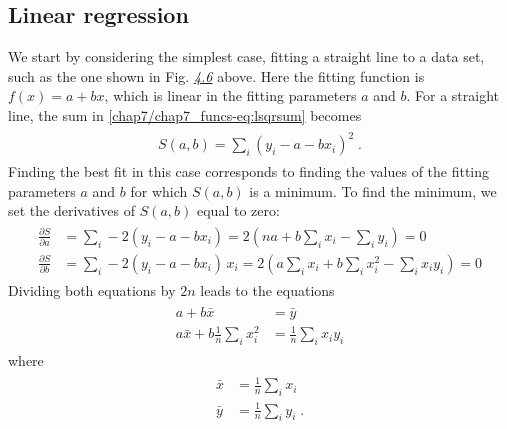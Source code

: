 \documentclass[letterpaper,10pt,english]{sphinxmanual}
\begin{document}
\subsection{Linear regression}
\label{chap7/chap7_funcs:linear-regression}
We start by considering the simplest case, fitting a straight line to a data set, such as the one shown in Fig. {\hyperref[chap7/chap7_funcs:fig-fallingmassdataplot]{\emph{4.6}}} above.  Here the fitting function is $f(x) = a + bx$, which is linear in the fitting parameters $a$ and $b$.  For a straight line, the sum in \eqref{chap7/chap7_funcs-eq:lsqrsum} becomes
\label{chap7/chap7_funcs:equation-eq:linreg1}\begin{gather}
\begin{split}S(a,b) = \sum_{i} (y_{i} - a - bx_{i})^2 \;.\end{split}\label{chap7/chap7_funcs-eq:linreg1}
\end{gather}
Finding the best fit in this case corresponds to finding the values of the fitting parameters $a$ and $b$ for which $S(a,b)$ is a minimum.  To find the minimum, we set the derivatives of $S(a,b)$ equal to zero:
\label{chap7/chap7_funcs:equation-eq:linreg2}\begin{gather}
\begin{split}\frac{\partial S}{\partial a} &= \sum_{i}-2(y_{i}-a-bx_{i}) = 2 \left(na + b\sum_{i}x_{i} - \sum_{i}y_{i} \right) = 0 \\
\frac{\partial S}{\partial b} &= \sum_{i}-2(y_{i}-a-bx_{i})\,x_{i} = 2 \left(a\sum_{i}x_{i} + b\sum_{i}x_{i}^2 - \sum_{i}x_{i}y_{i} \right) = 0\end{split}\label{chap7/chap7_funcs-eq:linreg2}
\end{gather}
Dividing both equations by $2n$ leads to the equations
\label{chap7/chap7_funcs:equation-eq:ablinreg}\begin{gather}
\begin{split}a + b\bar{x} &= \bar{y}\\
a\bar{x} + b\frac{1}{n}\sum_{i}x_{i}^2  &=  \frac{1}{n}\sum_{i}x_{i}y_{i}\end{split}\label{chap7/chap7_funcs-eq:ablinreg}
\end{gather}
where
\label{chap7/chap7_funcs:equation-eq:linreg3}\begin{gather}
\begin{split}\bar{x} &= \frac{1}{n}\sum_{i}x_{i}\\
\bar{y} &= \frac{1}{n}\sum_{i}y_{i}\;.\end{split}\label{chap7/chap7_funcs-eq:linreg3}
\end{gather}
\end{document}
